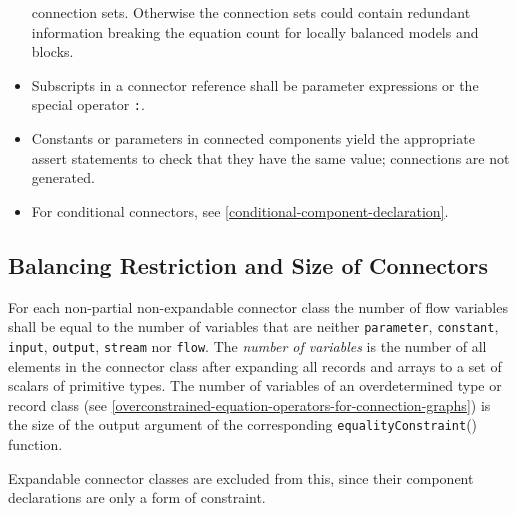 \begin{itemize}
\begin{nonnormative}
  connection sets.  Otherwise the connection sets could contain redundant information breaking the equation count for locally balanced models and blocks.
  \end{nonnormative}
\item
  Subscripts in a connector reference shall be parameter expressions or
  the special operator \lstinline!:!.
\item
  Constants or parameters in connected components yield the appropriate
  assert statements to check that they have the same value; connections
  are not generated.
\item
  For conditional connectors, see \autoref{conditional-component-declaration}.
\end{itemize}

\subsection{Balancing Restriction and Size of Connectors}

For each non-partial non-expandable connector class the number of flow variables shall
be equal to the number of variables that are neither \lstinline!parameter!,
\lstinline!constant!, \lstinline!input!, \lstinline!output!, \lstinline!stream!
nor \lstinline!flow!. The \emph{number of variables} is
the number of all elements in the connector class after expanding all
records and arrays to a set of scalars of primitive types. The number of
variables of an overdetermined type or record class (see \autoref{overconstrained-equation-operators-for-connection-graphs})
is the size of the output argument of the corresponding
\lstinline!equalityConstraint!() function.
\begin{nonnormative}
Expandable connector classes are excluded from this, since their component declarations are only a form of constraint.
\end{nonnormative}

